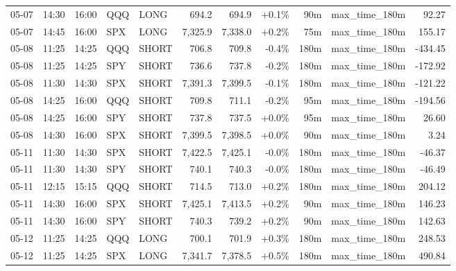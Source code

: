 \documentclass[11pt,a4paper,twoside]{article}
\begin{document}
\begin{center}
\begin{longtable}{>{\color{txtmain}}l l l l l r r r r >{\color{txtmain}}l r}
05-07 & 14:30 & 16:00 & QQQ & LONG & 694.2 & 694.9 & \textcolor{wingreen}{+0.1\%} & 90m & max\_time\_180m & \textcolor{wingreen}{92.27} \\
05-07 & 14:45 & 16:00 & SPX & LONG & 7,325.9 & 7,338.0 & \textcolor{wingreen}{+0.2\%} & 75m & max\_time\_180m & \textcolor{wingreen}{155.17} \\
05-08 & 11:25 & 14:25 & QQQ & SHORT & 706.8 & 709.8 & \textcolor{lossred}{-0.4\%} & 180m & max\_time\_180m & \textcolor{lossred}{-434.45} \\
05-08 & 11:25 & 14:25 & SPY & SHORT & 736.6 & 737.8 & \textcolor{lossred}{-0.2\%} & 180m & max\_time\_180m & \textcolor{lossred}{-172.92} \\
05-08 & 11:30 & 14:30 & SPX & SHORT & 7,391.3 & 7,399.5 & \textcolor{lossred}{-0.1\%} & 180m & max\_time\_180m & \textcolor{lossred}{-121.22} \\
05-08 & 14:25 & 16:00 & QQQ & SHORT & 709.8 & 711.1 & \textcolor{lossred}{-0.2\%} & 95m & max\_time\_180m & \textcolor{lossred}{-194.56} \\
05-08 & 14:25 & 16:00 & SPY & SHORT & 737.8 & 737.5 & \textcolor{wingreen}{+0.0\%} & 95m & max\_time\_180m & \textcolor{wingreen}{26.60} \\
05-08 & 14:30 & 16:00 & SPX & SHORT & 7,399.5 & 7,398.5 & \textcolor{wingreen}{+0.0\%} & 90m & max\_time\_180m & \textcolor{wingreen}{3.24} \\
05-11 & 11:30 & 14:30 & SPX & SHORT & 7,422.5 & 7,425.1 & \textcolor{lossred}{-0.0\%} & 180m & max\_time\_180m & \textcolor{lossred}{-46.37} \\
05-11 & 11:30 & 14:30 & SPY & SHORT & 740.1 & 740.3 & \textcolor{lossred}{-0.0\%} & 180m & max\_time\_180m & \textcolor{lossred}{-46.49} \\
05-11 & 12:15 & 15:15 & QQQ & SHORT & 714.5 & 713.0 & \textcolor{wingreen}{+0.2\%} & 180m & max\_time\_180m & \textcolor{wingreen}{204.12} \\
05-11 & 14:30 & 16:00 & SPX & SHORT & 7,425.1 & 7,413.5 & \textcolor{wingreen}{+0.2\%} & 90m & max\_time\_180m & \textcolor{wingreen}{146.23} \\
05-11 & 14:30 & 16:00 & SPY & SHORT & 740.3 & 739.2 & \textcolor{wingreen}{+0.2\%} & 90m & max\_time\_180m & \textcolor{wingreen}{142.63} \\
05-12 & 11:25 & 14:25 & QQQ & LONG & 700.1 & 701.9 & \textcolor{wingreen}{+0.3\%} & 180m & max\_time\_180m & \textcolor{wingreen}{248.53} \\
05-12 & 11:25 & 14:25 & SPX & LONG & 7,341.7 & 7,378.5 & \textcolor{wingreen}{+0.5\%} & 180m & max\_time\_180m & \textcolor{wingreen}{490.84} \\

\end{longtable}
\end{center}
\end{document}
